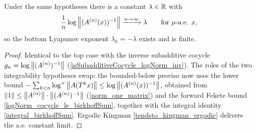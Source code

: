 \begin{theorem}\label{furstenbergKesten_norm_inv}
  \leanok
  Under the same hypotheses there is a constant \(\lambda \in \mathbb{R}\) with
  \[
    \frac{1}{n}\log\left\lVert (A^{(n)}(x))^{-1} \right\rVert \xrightarrow{n\to\infty} \lambda
    \qquad \text{for } \mu\text{-a.e. } x,
  \]
  so the bottom Lyapunov exponent \(\lambda_k = -\lambda\) exists and is finite.
\end{theorem}
\begin{proof}\leanok
  Identical to the top case with the inverse subadditive cocycle
  \(g_n = \log\left\lVert (A^{(n)})^{-1} \right\rVert\) (\ref{isSubadditiveCocycle_logNorm_inv}). The roles of
  the two integrability hypotheses swap: the bounded-below proviso now uses the lower
  bound \(-\sum_{k<n}\log^{+}\left\lVert A(T^{k}x) \right\rVert \le \log\left\lVert (A^{(n)}(x))^{-1} \right\rVert\), obtained
  from \(\left\lVert 1 \right\rVert \le \left\lVert A^{(n)} \right\rVert\cdot\left\lVert (A^{(n)})^{-1} \right\rVert\) (\ref{norm_one_matrix}) and
  the forward Fekete bound \ref{logNorm_cocycle_le_birkhoffSum}, together with the integral
  identity \ref{integral_birkhoffSum}. Ergodic Kingman \ref{tendsto_kingman_ergodic}
  delivers the a.e. constant limit.
\end{proof}
